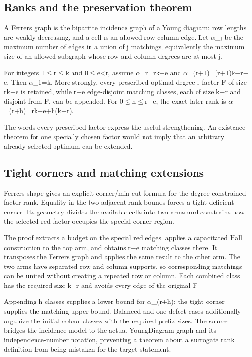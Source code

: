 \documentclass[11pt,a4paper]{article}
\begin{document}
\subsection{Ranks and the preservation theorem}
A Ferrers graph is the bipartite incidence graph of a Young diagram: row lengths are weakly decreasing, and a cell is an allowed row-column edge. Let \ensuremath{\alpha}\_j be the maximum number of edges in a union of j matchings, equivalently the maximum size of an allowed subgraph whose row and column degrees are at most j.

For integers 1\ensuremath{\leq}r\ensuremath{\leq}k and 0\ensuremath{\leq}e<r, assume \ensuremath{\alpha}\_r=rk\ensuremath{-}e and \ensuremath{\alpha}\_(r+1)=(r+1)k\ensuremath{-}r\ensuremath{-}e. Then \ensuremath{\alpha}\_1=k. More strongly, every prescribed optimal degree-r factor F of size rk\ensuremath{-}e is retained, while r\ensuremath{-}e edge-disjoint matching classes, each of size k\ensuremath{-}r and disjoint from F, can be appended. For 0\ensuremath{\leq}h\ensuremath{\leq}r\ensuremath{-}e, the exact later rank is \ensuremath{\alpha}\_(r+h)=rk\ensuremath{-}e+h(k\ensuremath{-}r).

The words every prescribed factor express the useful strengthening. An existence theorem for one specially chosen factor would not imply that an arbitrary already-selected optimum can be extended.

\subsection{Tight corners and matching extensions}
Ferrers shape gives an explicit corner/min-cut formula for the degree-constrained factor rank. Equality in the two adjacent rank bounds forces a tight deficient corner. Its geometry divides the available cells into two arms and constrains how the selected red factor occupies the special corner region.

The proof extracts a budget on the special red edges, applies a capacitated Hall construction to the top arm, and obtains r\ensuremath{-}e matching classes there. It transposes the Ferrers graph and applies the same result to the other arm. The two arms have separated row and column supports, so corresponding matchings can be united without creating a repeated row or column. Each combined class has the required size k\ensuremath{-}r and avoids every edge of the original F.

Appending h classes supplies a lower bound for \ensuremath{\alpha}\_(r+h); the tight corner supplies the matching upper bound. Balanced and one-defect cases additionally organize the initial colour classes with the required prefix sizes. The source bridges the incidence model to the actual YoungDiagram graph and its independence-number notation, preventing a theorem about a surrogate rank definition from being mistaken for the target statement.
\end{document}
